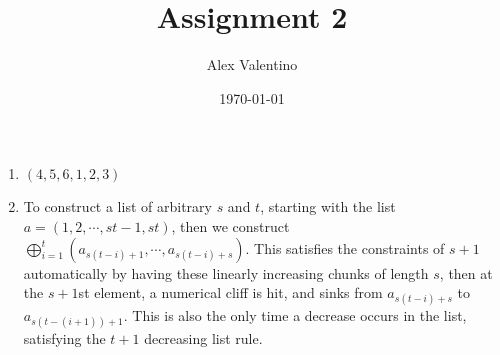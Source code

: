 \documentclass[12pt, letterpaper]{article}
\date{\today}
\author{Alex Valentino}
\title{Assignment 2}
\begin{document}
	\begin{enumerate}
		\item $(4,5,6,1,2,3)$
		\item To construct a list of arbitrary $s$ and $t$, starting with the list $a = (1,2,\cdots,st-1,st)$, then we construct $\displaystyle \bigoplus_{i=1}^{t}(a_{s(t-i)+1},\cdots,a_{s(t-i)+s})$.  This satisfies the constraints of $s+1$ automatically by having these linearly increasing chunks of length $s$, then at the $s+1$st element, a numerical cliff is hit, and sinks from $a_{s(t-i)+s}$ to $a_{s(t-(i+1))+1}$.  This is also the only time a decrease occurs in the list, satisfying the $t+1$ decreasing list rule.  
		 
	\end{enumerate}
\end{document}
